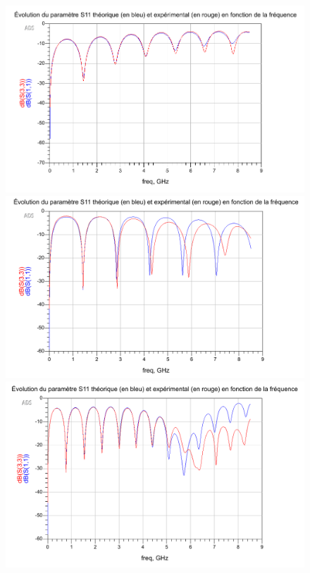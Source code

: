 \documentclass[french]{article}
\begin{document}
\begin{figure}[H]
	\centering
	\includegraphics[scale=0.24]{../2carac/caract_large_bande/caract_large_bande_teflarge.png}
	\includegraphics[scale=0.20]{../2carac/caract_large_bande/caract_large_bande_teffin.png}\\
	\includegraphics[scale=0.20]{../2carac/caract_large_bande/caract_large_bande_epoxylarge.png}

\end{figure}
\end{document}

